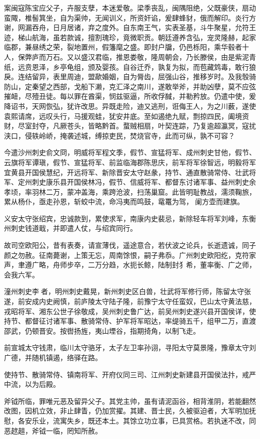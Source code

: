 \documentclass[]{article}
\begin{document}
案闽寇陈宝应父子，卉服支孽，本迷爱敬。梁季丧乱，闽隅阻绝，父既豪侠，扇动蛮陬，椎髻箕坐，自为渠帅，无闻训义，所资奸谄，爰肆蜂豺，俄而解印。炎行方谢，网漏吞舟，日月居诸，弃之度外。自东南王气，实表圣基，斗牛聚星，允符王迹，梯山航海，虽若款诚，擅割瑰珍，竟微职贡。朝廷遵养含弘，宠灵隆赫，起家临郡，兼昼绣之荣，裂地置州，假籓麾之盛。即封户牖，仍邑栎阳，乘华毂者十人，保弊庐而万石。又以盛汉君临，推恩娄敬，隆周朝会，乃长滕侯，由是紫泥青纸，远贲恩泽，乡亭龟组，颁及婴孩。自谷迁乔，孰复为拟，而苞藏鸩毒，敢行狼戾。连结留异，表里周迪，盟歃婚姻，自为脣齿，屈强山谷，推移岁时。及我彀骑防山，定秦望之西部，戈船下濑，克汇泽之南川，遂敢举斧，并助凶孽，莫不应弦摧衄，尽殪丑徒。每以罪在酋渠，悯兹驱逼，所收俘馘，并勒矜放。仍遣中使，爰降诏书，天网恢弘，犹许改思。异既走险，迪又逃刑，诳侮王人，为之川薮，遂使袁熙请席，远叹头行，马援观蛙，犹安井底。至如遏绝九赋，剽掠四民，阖境资财，尽室封夺，凡厥苍头，皆略黔首。蝥贼相扇，叶契连踪，乃复逾超瀛冥，寇扰浃口，侵轶岭峤，掩袭述城，缚掠吏民，焚烧官寺，此而可纵，孰不可容？

今遣沙州刺史俞文冏，明威将军程文季，假节、宣猛将军、成州刺史甘他，假节、云旗将军谭瑱，假节、宣猛将军、前监临海郡陈思庆，前军将军徐智远，明毅将军宜黄县开国侯慧纪，开远将军、新除晋安太守赵彖，持节、通直散骑常侍、壮武将军、定州刺史康乐县开国侯林冯，假节、信威将军、都督东讨诸军事、益州刺史余孝顷，率羽林二万，蒙冲盖海，乘跨沧波，扫荡巢窟。此皆明耻教战，濡须鞠旅，累从杨仆，亟走孙恩，斩蛟中流，命冯夷而鸣鼓，鼋鼍为驾，阑方壶而建旗。

义安太守张绍宾，忠诚款到，累使求军，南康内史裴忌，新除轻车将军刘峰，东衡州刺史钱道戢，并即遣人仗，与绍宾同行。

故司空欧阳公，昔有表奏，请宣薄伐，遥途意合，若伏波之论兵，长逝遗诚，同子颜之勿赦。征南薨谢，上策无忘，周南馀恨，嗣子弗忝。广州刺史欧阳纥，克符家声，聿遵广略，舟师步卒，二万分趋，水扼长鲸，陆制封犭希，董率衡、广之师，会我六军。

潼州刺史李者，明州刺史戴晃，新州刺史区白兽，壮武将军修行师，陈留太守张遂，前安成内史阙慎，前庐陵太守陆子隆，前豫宁太守任蛮奴，巴山太守黄法慈，戎昭将军、湘东公世子徐敬成，吴州刺史鲁广达，前吴州刺史遂兴县开国侯详，使持节、都督征讨诸军事、散骑常侍、护军将军昭达，率缇骑五千，组甲二万，直渡邵武，仍顿晋安。按辔扬旌，夷山堙谷，指期掎角，以制飞走。

前宣城太守钱肃，临川太守骆牙，太子左卫率孙诩，寻阳太守莫景隆，豫章太守刘广德，并随机镇遏，络驿在路。

使持节、散骑常侍、镇南将军、开府仪同三司、江州刺史新建县开国侯法抃，戒严中流，以为后殿。

斧钺所临，罪唯元恶及留异父子。其党主帅，虽有请泥函谷，相背淮阴，若能翻然改图，因机立效，非止肆眚，仍加赏擢。其建、晋士民，久被驱迫者，大军明加抚慰，各安乐业，流寓失乡，既还本土。其馀立功立事，已具赏格。若执迷不改，同恶趑趄，斧钺一临，罔知所赦。
\end{document}

